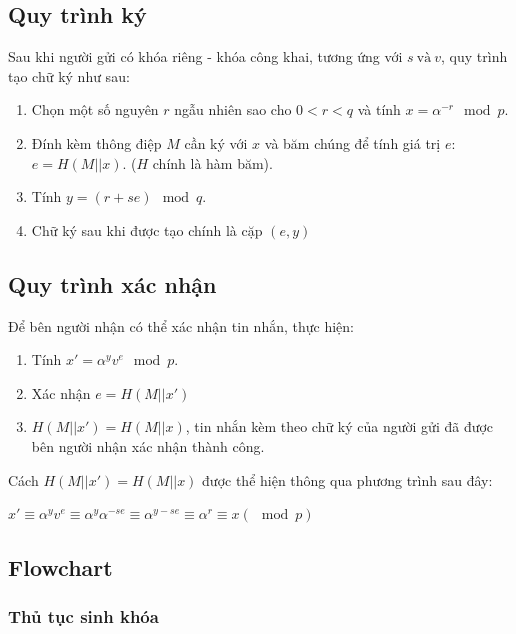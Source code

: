 \subsection{Quy trình ký}

Sau khi người gửi có khóa riêng - khóa công khai, tương ứng với $s ~\text{và}~ v$, quy trình tạo chữ ký như sau:

\begin{enumerate}[label=\textbf{Bước \arabic*:}, leftmargin = 2.5cm]
	\item Chọn một số nguyên $r$ ngẫu nhiên sao cho $0<r<q$ và tính $x = \alpha^{-r} \mod p $.
	\item Đính kèm thông điệp $M$ cần ký với $x$ và băm chúng để tính giá trị $e$: $e = H(M||x)$. ($H$ chính là hàm băm).
	\item Tính $y = (r+se) \mod q$.
	\item Chữ ký sau khi được tạo chính là cặp $(e,y)$

\end{enumerate}

\subsection{Quy trình xác nhận}

Để bên người nhận có thể xác nhận tin nhắn, thực hiện:

\begin{enumerate}[label=\textbf{Bước \arabic*:}, leftmargin = 2.5cm]
	\item Tính $x' = \alpha^{y}v^e\mod p$.
	\item Xác nhận $e = H(M||x')$
	\item $H(M||x') = H(M||x)$, tin nhắn kèm theo chữ ký của người gửi đã được bên người nhận xác nhận thành công.
\end{enumerate}

Cách $H(M||x') = H(M||x)$ được thể hiện thông qua phương trình sau đây:

\begin{center}
	$x' \equiv \alpha^{y}v^e \equiv \alpha^{y} \alpha^{-se} \equiv \alpha^{y-se} \equiv \alpha^r \equiv x(\mod p)$
\end{center}

\subsection{Flowchart}

\subsubsection{Thủ tục sinh khóa}


